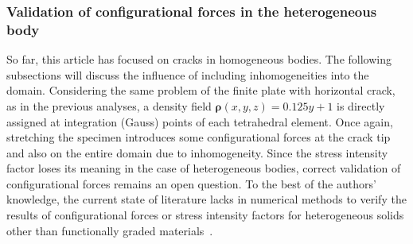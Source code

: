 \documentclass[11pt]{acmeArticle}
\numberwithin{equation}{section}
\begin{document}
\subsubsection{Validation of configurational forces in the heterogeneous body}
So far, this article has focused on cracks in homogeneous bodies. 
The following subsections will discuss the influence of including inhomogeneities into the domain. 
Considering the same problem of the finite plate with horizontal crack, as in the previous analyses, a density field $\mathbf{\rho}(x,y,z) = 0.125y + 1$ is directly assigned at integration (Gauss) points of each tetrahedral element.
Once again, stretching the specimen introduces some configurational forces at the crack tip and also on the entire domain due to inhomogeneity. 
Since the stress intensity factor loses its meaning in the case of heterogeneous bodies, correct validation of configurational forces remains an open question. 
To the best of the authors' knowledge, the current state of literature lacks in numerical methods to verify the results of configurational forces or stress intensity factors for heterogeneous solids other than functionally graded materials~\citep{kim2002finite}.
\end{document}
